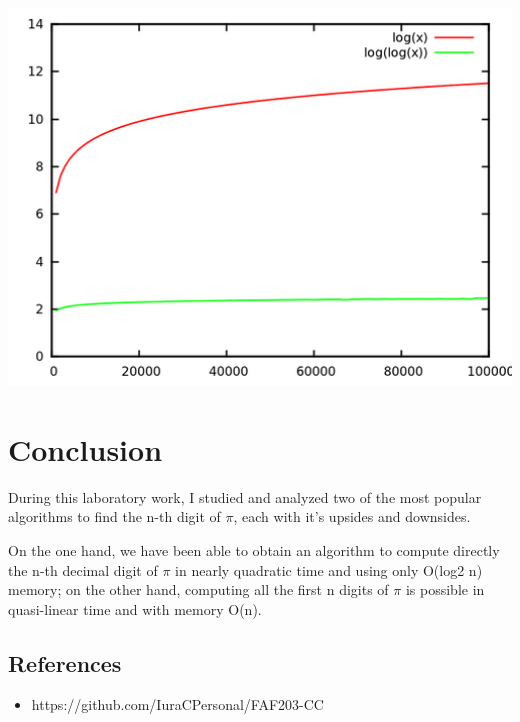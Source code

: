 \documentclass[a4paper, 12pt]{article}
\begin{document}
\begin{center}
    \includegraphics[width=15cm]{graph.png}
\end{center}

\section{Conclusion}

During this laboratory work, I studied and analyzed two
of the most popular algorithms to find the n-th digit of $\pi$, each with it's upsides and downsides.

On the one hand, we have been able to obtain an algorithm to compute directly the n-th decimal
digit of $\pi$ in nearly quadratic time and using only O(log2
n) memory; on the other hand, computing
all the first n digits of $\pi$ is possible in quasi-linear time and with memory O(n).
\subsection{References}

\begin{itemize}
    \item https://github.com/IuraCPersonal/FAF203-CC
\end{itemize}
\end{document}
